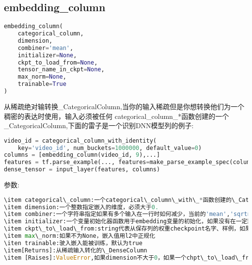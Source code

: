 \subsection{embedding\_column}
\begin{lstlisting}[language=Python]
embedding_column(
    categorical_column,
    dimension,
    combiner='mean',
    initializer=None,
    ckpt_to_load_from=None,
    tensor_name_in_ckpt=None,
    max_norm=None,
    trainable=True
)
\end{lstlisting}
从稀疏绝对输转换\_CategoricalColumn,当你的输入稀疏但是你想转换他们为一个稠密的表达时使用，输入必须被任何 categorical\_column\_*函数创建的一个\_CategoricalColumn,下面的雷子是一个识别DNN模型列的例子:
\begin{lstlisting}[language=Python]
video_id = categorical_column_with_identity(
    key='video_id', num_buckets=1000000, default_value=0)
columns = [embedding_column(video_id, 9),...]
features = tf.parse_example(..., features=make_parse_example_spec(columns))
dense_tensor = input_layer(features, columns)
\end{lstlisting}
参数:
\begin{lstlisting}[language=Python]
\item categorical\_column:一个categorical\_column\_with\_*函数创建的\_CategoricalColumn,这个列生成代表嵌入的查找的稀疏ID。
\item dimension:一个整数指定嵌入的维度，必须大于0.
\item combiner:一个字符串指定如果有多个输入在一行时如何减少，当前的'mean','sqrtn'和'sum'被支持，'mean'默认，'sqrtn'经常得到好的精度，特别是词袋模型，每一个可以被认为每列作为样本级别的正规化。对于更多信息，查看tf.embedding\_lookup\_sparse.
\item initializer:一个变量初始化器函数用于embedding变量的初始化，如果没有在一定默认为tf.truncated\_normal\_initializer,均值为0标准差为1/sqrt(demension).
\item ckpt\_to\_load\_from:string代表从保存列的权重checkpoint名字、样例，如果tensor\_name\_load\_from不是None
\item max\_norm:如果不为None，嵌入值用l2中正规化
\iten trainable:驶入嵌入能被训练，默认为true
\item[Returns]:从稀疏输入转化的\_DenseColumn
\item [Raises]:ValueError,如果dimension不大于0，如果一个chpt\_to\_load\_from和tensor\_name\_in\_ckpt被指定，如果initializer被指定不被调用。
\end{lstlisting}
